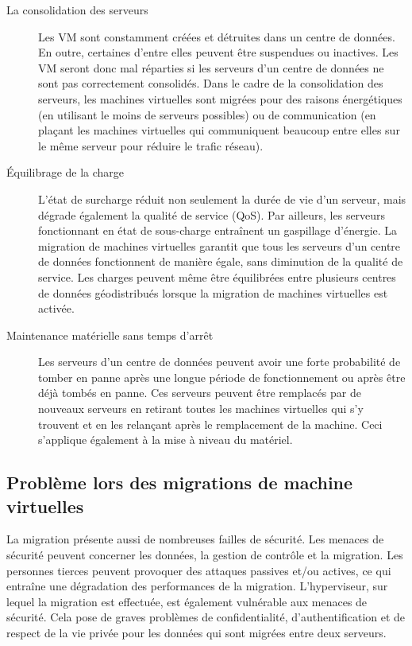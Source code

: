 \begin{description}
    \item[La consolidation des serveurs]
    Les VM sont constamment créées et détruites dans un centre de données.
    En outre, certaines d'entre elles peuvent être suspendues ou inactives.
    Les VM seront donc mal réparties si les serveurs d'un centre de données ne sont pas correctement consolidés.
    Dans le cadre de la consolidation des serveurs, les machines virtuelles sont migrées pour des raisons énergétiques (en utilisant le moins de serveurs possibles) ou de communication (en plaçant les machines virtuelles qui communiquent beaucoup entre elles sur le même serveur pour réduire le trafic réseau).
    
    \item[Équilibrage de la charge]
    L'état de surcharge réduit non seulement la durée de vie d'un serveur, mais dégrade également la qualité de service (QoS).
    Par ailleurs, les serveurs fonctionnant en état de sous-charge entraînent un gaspillage d'énergie.
    La migration de machines virtuelles garantit que tous les serveurs d'un centre de données fonctionnent de manière égale, sans diminution de la qualité de service.
    Les charges peuvent même être équilibrées entre plusieurs centres de données géodistribués lorsque la migration de machines virtuelles est activée.

    \item[Maintenance matérielle sans temps d'arrêt]
    Les serveurs d'un centre de données peuvent avoir une forte probabilité de tomber en panne après une longue période de fonctionnement ou après être déjà tombés en panne.
    Ces serveurs peuvent être remplacés par de nouveaux serveurs en retirant toutes les machines virtuelles qui s'y trouvent et en les relançant après le remplacement de la machine. 
    Ceci s'applique également à la mise à niveau du matériel.

\end{description} 



\subsection{Problème lors des migrations de machine virtuelles}

La migration présente aussi de nombreuses failles de sécurité.
Les menaces de sécurité peuvent concerner les données, la gestion de contrôle et la migration.
Les personnes tierces peuvent provoquer des attaques passives et/ou actives, ce qui entraîne une dégradation des performances de la migration.
L'hyperviseur, sur lequel la migration est effectuée, est également vulnérable aux menaces de sécurité.
Cela pose de graves problèmes de confidentialité, d'authentification et de respect de la vie privée pour les données qui sont migrées entre deux serveurs.

